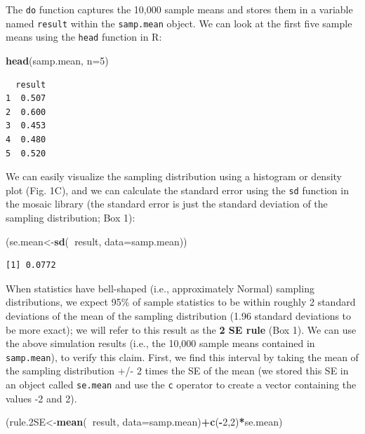 \documentclass[fleqn,10pt]{wlpeerj} %
\newenvironment{Shaded}{\begin{snugshade}}{\end{snugshade}}
\newcommand{\DataTypeTok}[1]{\textcolor[rgb]{0.13,0.29,0.53}{#1}}
\newcommand{\DecValTok}[1]{\textcolor[rgb]{0.00,0.00,0.81}{#1}}
\newcommand{\FloatTok}[1]{\textcolor[rgb]{0.00,0.00,0.81}{#1}}
\newcommand{\KeywordTok}[1]{\textcolor[rgb]{0.13,0.29,0.53}{\textbf{#1}}}
\newcommand{\NormalTok}[1]{#1}
\newcommand{\OperatorTok}[1]{\textcolor[rgb]{0.81,0.36,0.00}{\textbf{#1}}}
\begin{document}
The \texttt{do} function captures the 10,000 sample means and stores them in a variable named \texttt{result} within the \texttt{samp.mean} object. We can look at the first five sample means using the \texttt{head} function in R:

\begin{Shaded}
\begin{Highlighting}[]
\KeywordTok{head}\NormalTok{(samp.mean, }\DataTypeTok{n=}\DecValTok{5}\NormalTok{)  }
\end{Highlighting}
\end{Shaded}

\begin{verbatim}
  result
1  0.507
2  0.600
3  0.453
4  0.480
5  0.520
\end{verbatim}

We can easily visualize the sampling distribution using a histogram or density plot (Fig. 1C), and we can calculate the standard error using the \texttt{sd} function in the mosaic library (the standard error is just the standard deviation of the sampling distribution; Box 1):

\begin{Shaded}
\begin{Highlighting}[]
\NormalTok{(se.mean<-}\KeywordTok{sd}\NormalTok{(}\OperatorTok{~}\NormalTok{result, }\DataTypeTok{data=}\NormalTok{samp.mean))}
\end{Highlighting}
\end{Shaded}

\begin{verbatim}
[1] 0.0772
\end{verbatim}

When statistics have bell-shaped (i.e., approximately Normal) sampling distributions, we expect 95\% of sample statistics to be within roughly 2 standard deviations of the mean of the sampling distribution (1.96 standard deviations to be more exact); we will refer to this result as the \textbf{2 SE rule} (Box 1). We can use the above simulation results (i.e., the 10,000 sample means contained in \texttt{samp.mean}), to verify this claim. First, we find this interval by taking the mean of the sampling distribution +/- 2 times the SE of the mean (we stored this SE in an object called \texttt{se.mean} and use the \texttt{c} operator to create a vector containing the values -2 and 2).

\begin{Shaded}
\begin{Highlighting}[]
\NormalTok{(rule}\FloatTok{.2}\NormalTok{SE<-}\KeywordTok{mean}\NormalTok{(}\OperatorTok{~}\NormalTok{result, }\DataTypeTok{data=}\NormalTok{samp.mean)}\OperatorTok{+}\KeywordTok{c}\NormalTok{(}\OperatorTok{-}\DecValTok{2}\NormalTok{,}\DecValTok{2}\NormalTok{)}\OperatorTok{*}\NormalTok{se.mean)}
\end{Highlighting}
\end{Shaded}
\end{document}
